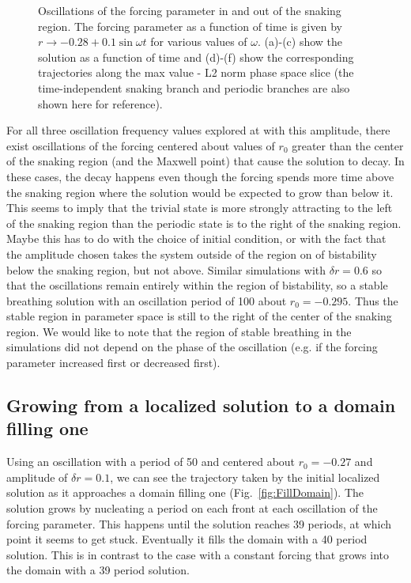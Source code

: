 \documentclass[pre,preprint,superscriptaddress]{revtex4-1}
\begin{document}
\begin{figure}[h!]
\begin{center}
{}
    \caption{Oscillations of the forcing parameter in and out of the snaking region.  The forcing parameter as a function of time is given by $r\rightarrow -0.28+ 0.1\sin\omega t$ for various values of $\omega$. (a)-(c) show the solution as a function of time and (d)-(f) show the corresponding trajectories along the max value - L2 norm phase space slice (the time-independent snaking branch and periodic branches are also shown here for reference). }
    \label{fig:OscOutSnake}
  \end{center}
\end{figure}

For all three oscillation frequency values explored at with this amplitude, there exist oscillations of the forcing centered about values of $r_0$ greater than the center of the snaking region (and the Maxwell point) that cause the solution to decay.  In these cases, the decay happens even though the forcing spends more time above the snaking region where the solution would be expected to grow than below it.  This seems to imply that the trivial state is more strongly attracting to the left of the snaking region than the periodic state is to the right of the snaking region.  Maybe this has to do with the choice of initial condition, or with the fact that the amplitude chosen takes the system outside of the region on of bistability below the snaking region, but not above.  Similar simulations with $\delta r=0.6$ so that the oscillations remain entirely within the region of bistability, so a stable breathing solution with an oscillation period of 100 about $r_0=-0.295$.  Thus the stable region in parameter space is still to the right of the center of the snaking region.   We would like to note that the region of stable breathing in the simulations did not depend on the phase of the oscillation (e.g. if the forcing parameter increased first or decreased first). 

\subsection{Growing from a localized solution to a domain filling one}
 
Using an oscillation with a period of 50 and centered about $r_0=-0.27$ and amplitude of $\delta r =0.1$, we can see the trajectory taken by the initial localized solution as it approaches a domain filling one (Fig.~\ref{fig:FillDomain}).  The solution grows by nucleating a period on each front at each oscillation of the forcing parameter. This happens until the solution reaches 39 periods, at which point it seems to get stuck.  Eventually it fills the domain with a 40 period solution.  This is in contrast to the case with a constant forcing that grows into the domain with a 39 period solution.  
\end{document}
